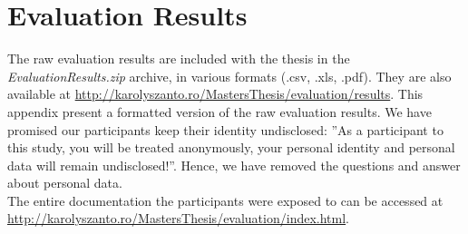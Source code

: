 \chapter{Evaluation Results}\label{ch:evaluation_results}
The raw evaluation results are included with the thesis in the \emph{EvaluationResults.zip} archive, in various formats (.csv, .xls, .pdf). They are also available at \url{http://karolyszanto.ro/MastersThesis/evaluation/results}. This appendix present a formatted version of the raw evaluation results. We have promised our participants keep their identity undisclosed: ''As a participant to this study, you will be treated anonymously, your personal identity and personal data will remain undisclosed!''. Hence, we have removed the questions and answer about personal data.\\

The entire documentation the participants were exposed to can be accessed at \url{http://karolyszanto.ro/MastersThesis/evaluation/index.html}.



